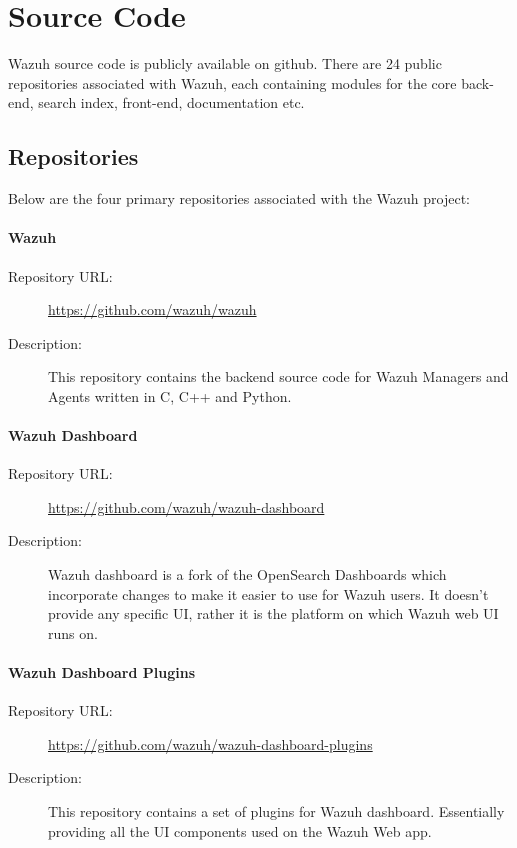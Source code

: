 \newpage
\section{Source Code}
Wazuh source code is publicly available on github. There are 24 public repositories associated with Wazuh, each containing modules for the core back-end, search index, front-end, documentation etc. 

\subsection{Repositories}
Below are the four primary repositories associated with the Wazuh project:

\paragraph*{Wazuh}
\begin{description}
    \item[Repository URL:] \url{https://github.com/wazuh/wazuh}
    \item[Description:] This repository contains the backend source code for Wazuh Managers and Agents written in C, C++ and Python.
\end{description}

\paragraph*{Wazuh Dashboard}
\begin{description}
    \item[Repository URL:] \url{https://github.com/wazuh/wazuh-dashboard}
    \item[Description:] Wazuh dashboard is a fork of the OpenSearch Dashboards which incorporate changes to make it easier to use for Wazuh users. It doesn't provide any specific UI, rather it is the platform on which Wazuh web UI runs on.
\end{description}

\paragraph*{Wazuh Dashboard Plugins}
\begin{description}
    \item[Repository URL:] \url{https://github.com/wazuh/wazuh-dashboard-plugins}
    \item[Description:] This repository contains a set of plugins for Wazuh dashboard. Essentially providing all the UI components used on the Wazuh Web app.
\end{description}

